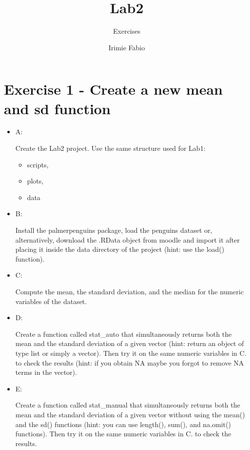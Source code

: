 \documentclass[
]{article}
\title{Lab2}
\subtitle{Exercises}
\author{Irimie Fabio}
\date{}
\providecommand{\tightlist}{%
  \setlength{\itemsep}{0pt}\setlength{\parskip}{0pt}}
\begin{document}
\maketitle

{
\setcounter{tocdepth}{2}
\tableofcontents
}
\hypertarget{exercise-1---create-a-new-mean-and-sd-function}{%
\section{Exercise 1 - Create a new mean and sd
function}\label{exercise-1---create-a-new-mean-and-sd-function}}

\begin{itemize}
\item
  A:

  Create the Lab2 project. Use the same structure used for Lab1:

  \begin{itemize}
  \tightlist
  \item
    scripts,
  \item
    plots,
  \item
    data
  \end{itemize}
\item
  B:

  Install the palmerpenguins package, load the penguins dataset or,
  alternatively, download the .RData object from moodle and import it
  after placing it inside the data directory of the project (hint: use
  the load() function).
\item
  C:

  Compute the mean, the standard deviation, and the median for the
  numeric variables of the dataset.
\item
  D:

  Create a function called stat\_auto that simultaneously returns both
  the mean and the standard deviation of a given vector (hint: return an
  object of type list or simply a vector). Then try it on the same
  numeric variables in C. to check the results (hint: if you obtain NA
  maybe you forgot to remove NA terms in the vector).
\item
  E:

  Create a function called stat\_manual that simultaneously returns both
  the mean and the standard deviation of a given vector without using
  the mean() and the sd() functions (hint: you can use length(), sum(),
  and na.omit() functions). Then try it on the same numeric variables in
  C. to check the results.
\end{itemize}
\end{document}
